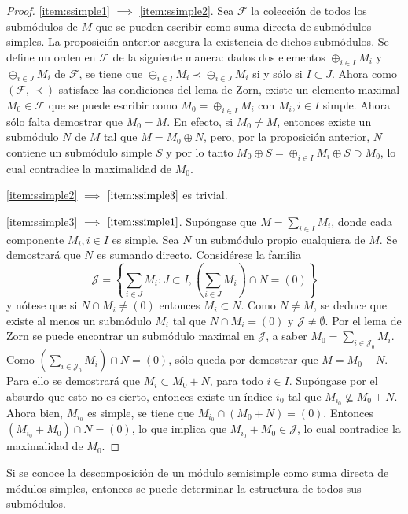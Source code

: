 \begin{proof}
\ref{item:ssimple1} $\implies$ \ref{item:ssimple2}. Sea $\mathcal{F}$ la colección de todos los submódulos de $M$ que se pueden escribir como suma directa de submódulos simples. La proposición anterior asegura la existencia de dichos submódulos. Se define un orden en $\mathcal{F}$ de la siguiente manera: dados dos elementos $\oplus_{i \in I}M_i$ y $\oplus_{i \in J}M_i$ de $\mathcal{F}$, se tiene que $\oplus_{i \in I}M_i  \prec \oplus_{i \in J}M_i$ si y sólo si $I \subset J$. 
Ahora como $(\mathcal{F, \prec})$ satisface las condiciones del lema de Zorn, existe un elemento maximal $M_0 \in \mathcal{F}$ que se puede escribir como $M_0 = \oplus_{i \in I}M_i$ con $M_i, i \in I$ simple.
Ahora sólo falta demostrar que $M_0 = M$. En efecto, si $M_0 \neq M$, entonces existe un submódulo $N$ de $M$ tal que $M = M_0 \oplus N$, pero, por la proposición anterior, $N$ contiene un submódulo simple $S$ y por lo tanto $M_0 \oplus S = \oplus_{i \in I}M_i \oplus S \supset M_0$, lo cual contradice la maximalidad de $M_0$.

\ref{item:ssimple2} $\implies$ $\ref{item:ssimple3}$ es trivial.

\ref{item:ssimple3} $\implies$ $\ref{item:ssimple1}$. Supóngase que $M = \sum_{i \in I}M_i$, donde cada componente $M_i, i \in I$ es simple. Sea $N$ un submódulo propio cualquiera de $M$. Se demostrará que $N$ es sumando directo. 
Considérese la familia \[ \mathcal{J} = \left\{ \sum_{i \in J} M_i \colon J \subset I, \left(\sum_{i \in J}M_i \right) \cap N = (0)  \right\} \] y nótese que si $N \cap M_i \neq (0)$ entonces $M_i \subset N$. Como $N \neq M$, se deduce que existe al menos un submódulo $M_i$ tal que $N \cap M_i = (0)$ y $\mathcal{J} \neq \emptyset$. Por el lema de Zorn se puede encontrar un submódulo maximal en $\mathcal{J}$, a saber $M_0 = \sum_{i \in \mathcal{J}_0}M_i$. Como $\left( \sum_{i \in \mathcal{J}_0}M_i  \right) \cap N = (0)$, sólo queda por demostrar que $M = M_0 + N$. Para ello se demostrará que $M_i \subset M_0 + N$, para todo $i \in I$. Supóngase por el absurdo que esto no es cierto, entonces existe un índice $i_{0}$ tal que $M_{i_0} \nsubseteq M_0 + N $. Ahora bien, $M_{i_0}$ es simple, se tiene que $M_{i_0} \cap (M_0 + N) = (0)$. Entonces $(M_{i_0} + M_0)\cap N =(0)$, lo que implica que $M_{i_0} + M_0 \in \mathcal{J}$, lo cual contradice la maximalidad de $M_0$.
\end{proof}
Si se conoce la descomposición de un módulo semisimple como suma directa de módulos simples, entonces se puede determinar la estructura de todos sus submódulos. 
